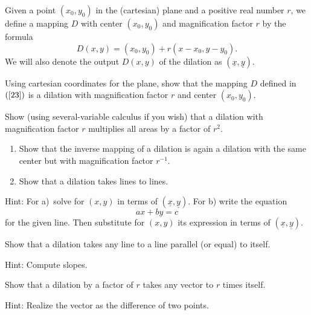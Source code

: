 \begin{definition}
Given a point $\left(  x_{0},y_{0}\right)  $ in the (cartesian) plane and a
positive real number $r$, we define a mapping $D$ with center $\left(
x_{0},y_{0}\right)  $ and magnification factor $r$ by the formula%
\begin{equation}
D\left(  x,y\right)  =\left(  x_{0},y_{0}\right)  +r\left(  x-x_{0}%
,y-y_{0}\right)  . \label{23}%
\end{equation}
We will also denote the output $D\left(  x,y\right)  $ of the dilation as
$\left(  \underline{x},\underline{y}\right)  $.
\end{definition}

\begin{question}
Using cartesian coordinates for the plane, show that the mapping
$D$ defined in $\left(  \ref{23}\right)  $ is a dilation with magnification
factor $r$ and center $\left(  x_{0},y_{0}\right)  $.
\end{question}

\begin{question}
Show (using several-variable calculus if you wish) that a
dilation with magnification factor $r$ multiplies all areas by a factor of
$r^{2}$.
\end{question}

\begin{question}\hfil
\begin{enumerate}
\item Show that the inverse mapping of a dilation is again a
dilation with the same center but with magnification factor $r^{-1}$.
\item Show that a dilation takes lines to lines.
\end{enumerate}
Hint: For a)\ solve for $\left(  x,y\right)  $ in terms of $\left(
\underline{x},\underline{y}\right)  $. For b) write the equation%
\[
ax+by=c
\]
for the given line. Then substitute for $\left(  x,y\right)  $ its expression
in terms of $\left(  \underline{x},\underline{y}\right)$.
\end{question}

\begin{question}
Show that a dilation takes any line to a line parallel (or
equal) to itself.

Hint: Compute slopes.
\end{question}

\begin{question}
Show that a dilation by a factor of $r$ takes any vector to $r$
times itself.

Hint: Realize the vector as the difference of two points.
\end{question}

